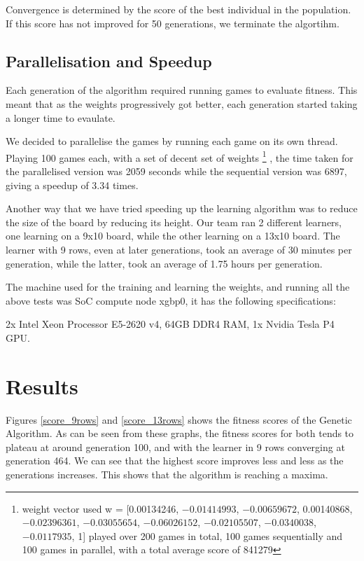 \documentclass[a4paper,12pt,twocolumn]{article}
\begin{document}
Convergence is determined by the score of the best individual in the population.
If this score has not improved for 50 generations, we terminate the algortihm.

\subsection{Parallelisation and Speedup}
\label{parallelisation_n_speedup}
Each generation of the algorithm required running games to evaluate fitness. This
meant that as the weights progressively got better, each generation started
taking a longer time to evaulate.

We decided to parallelise the games by running each game on its own thread. Playing
100 games each, with a set of decent set of weights
\footnote{
    weight vector used w = [0.00134246, $-0.01414993$, $-0.00659672$, 0.00140868, $-0.02396361$, $-0.03055654$, $-0.06026152$, $-0.02105507$, $-0.0340038$, $-0.0117935$, 1]
    played over 200 games in total, 100 games sequentially and 100 games in parallel, with a total average score of 841279
}
, the time taken for the parallelised version was 2059 seconds while the
sequential version was 6897, giving a speedup of 3.34 times.

Another way that we have tried speeding up the learning algorithm was to reduce
the size of the board by reducing its height. Our team ran 2 different learners,
one learning on a 9x10 board, while the other learning on a 13x10 board.
The learner with 9 rows, even at later generations, took an average of 30 minutes
per generation, while the latter, took an average of 1.75 hours per generation.

The machine used for the training and learning the weights, and running all the
above tests was SoC compute node xgbp0, it has the following specifications:

2x Intel Xeon Processor E5-2620 v4, 64GB DDR4 RAM, 1x Nvidia Tesla P4 GPU.

\section{Results}

Figures \ref{score_9rows} and \ref{score_13rows} shows the fitness scores of
the Genetic Algorithm. As can be seen from these graphs, the fitness scores for both
tends to plateau at around generation 100, and with the learner in 9 rows converging at generation 464.
We can see that the highest score improves less and less as the generations increases.
This shows that the algorithm is reaching a maxima.
\end{document}
